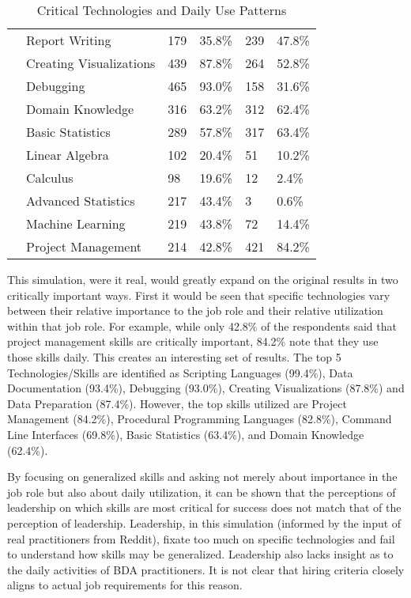 \begin{table}[]
\begin{tabular}{@{}llllll@{}}
 & Report Writing                   & 179 & 35.8\% & 239 & 47.8\% \\
 & Creating Visualizations          & 439 & 87.8\% & 264 & 52.8\% \\
 & Debugging                        & 465 & 93.0\% & 158 & 31.6\% \\
 & Domain Knowledge                 & 316 & 63.2\% & 312 & 62.4\% \\
 & Basic Statistics                 & 289 & 57.8\% & 317 & 63.4\% \\
 & Linear Algebra                   & 102 & 20.4\% & 51  & 10.2\% \\
 & Calculus                         & 98  & 19.6\% & 12  & 2.4\%  \\
 & Advanced Statistics              & 217 & 43.4\% & 3   & 0.6\%  \\
 & Machine Learning                 & 219 & 43.8\% & 72  & 14.4\% \\
 & Project Management               & 214 & 42.8\% & 421 & 84.2\% \\ \cmidrule(l){2-6}
\end{tabular}
\caption{Critical Technologies and Daily Use Patterns}
\label{tab:table2}
\end{table}

This simulation, were it real, would greatly expand on the original results in two critically important ways. First it would be seen that specific technologies vary between their relative importance to the job role and their relative utilization within that job role. For example, while only 42.8\% of the respondents said that project management skills are critically important, 84.2\% note that they use those skills daily. This creates an interesting set of results. The top 5 Technologies/Skills are identified as Scripting Languages (99.4\%), Data Documentation (93.4\%), Debugging (93.0\%), Creating Visualizations (87.8\%) and Data Preparation (87.4\%). However, the top skills utilized are Project Management (84.2\%), Procedural Programming Languages (82.8\%), Command Line Interfaces (69.8\%), Basic Statistics (63.4\%), and Domain Knowledge (62.4\%).

By focusing on generalized skills and asking not merely about importance in the job role but also about daily utilization, it can be shown that the perceptions of leadership on which skills are most critical for success does not match that of the perception of leadership. Leadership, in this simulation (informed by the input of real practitioners from Reddit), fixate too much on specific technologies and fail to understand how skills may be generalized. Leadership also lacks insight as to the daily activities of BDA practitioners. It is not clear that hiring criteria closely aligns to actual job requirements for this reason.

